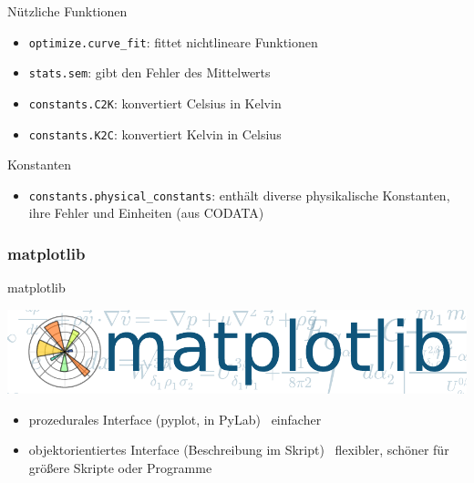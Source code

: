 \begin{frame}{Nützliche Funktionen}
  \begin{itemize}
    \item \texttt{optimize.curve\_fit}: fittet nichtlineare Funktionen
    \item \texttt{stats.sem}: gibt den Fehler des Mittelwerts
    \item \texttt{constants.C2K}: konvertiert Celsius in Kelvin
    \item \texttt{constants.K2C}: konvertiert Kelvin in Celsius
  \end{itemize}
\end{frame}

\begin{frame}{Konstanten}
  \begin{itemize}
    \item \texttt{constants.physical\_constants}: enthält diverse physikalische Konstanten, ihre Fehler und Einheiten (aus CODATA)
  \end{itemize}
\end{frame}

\subsubsection{matplotlib}
\begin{frame}{matplotlib}
  \begin{center}
    \includegraphics[width=\textwidth]{../Notes/img/matplotlib.pdf}
  \end{center}
  \begin{itemize}
    \item prozedurales Interface (pyplot, in PyLab) \mdash\ einfacher
    \item objektorientiertes Interface (Beschreibung im Skript) \mdash\ flexibler, schöner für größere Skripte oder Programme
  \end{itemize}
\end{frame}

